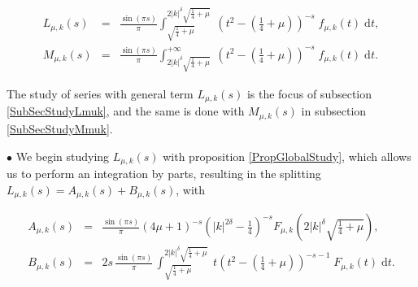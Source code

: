 \documentclass{jams-l}
\theoremstyle{definition}
\theoremstyle{remark}
\numberwithin{equation}{section}
\begin{document}
            \begin{equation}
            \label{LmukMmuk}
                \begin{array}{lll}
                    L_{\mu,k} \left( s \right) & = & \frac{\sin \left( \pi s \right)}{\pi} \int_{\sqrt{\frac{1}{4}+\mu}}^{2 \left \vert k \right \vert^{\delta} \sqrt{\frac{1}{4} + \mu}} \; \left( t^2 - \left( \frac{1}{4} + \mu \right) \right)^{-s} \; f_{\mu,k} \left( t \right) \; \text{d}t, \\[2em]
                    
                    M_{\mu,k} \left( s \right) & = & \frac{\sin \left( \pi s \right)}{\pi} \int_{2 \left \vert k \right \vert^{\delta} \sqrt{\frac{1}{4} + \mu}}^{+ \infty} \; \left( t^2 - \left( \frac{1}{4} + \mu \right) \right)^{-s} \; f_{\mu,k} \left( t \right) \; \text{d}t.
                \end{array}
            \end{equation}
            
            \noindent The study of series with general term $L_{\mu,k} \left( s \right)$ is the focus of subsection \ref{SubSecStudyLmuk}, and the same is done with $M_{\mu,k} \left( s \right)$ in subsection \ref{SubSecStudyMmuk}.
            
            \medskip
            
            \hspace{10pt} $\bullet$ We begin studying $L_{\mu,k} \left( s \right)$ with proposition \ref{PropGlobalStudy}, which allows us to perform an integration by parts, resulting in the splitting $L_{\mu,k} \left( s \right) = A_{\mu,k} \left( s \right) + B_{\mu,k} \left( s \right)$, with
            
                \begin{equation}
                \label{IntroAB}
                    \begin{array}{lll}
                        A_{\mu,k} \left( s \right) & = & \frac{\sin \left( \pi s \right)}{\pi} \left( 4 \mu + 1 \right)^{-s} \left( \left \vert k \right \vert^{2 \delta} - \frac{1}{4} \right)^{-s} F_{\mu,k} \left( 2 \left \vert k \right \vert^{\delta} \sqrt{\frac{1}{4}+\mu} \right), \\[2em]
                    
                        B_{\mu,k} \left( s \right) & = & 2s \, \frac{\sin \left( \pi s \right)}{\pi} \, \int_{\sqrt{\frac{1}{4}+\mu}}^{2 \left \vert k \right \vert^{\delta} \sqrt{\frac{1}{4}+\mu}} \; t \left( t^2 - \left( \frac{1}{4}+\mu \right) \right)^{-s-1} \; F_{\mu,k} \left( t \right) \; \text{d}t.
                    \end{array}
                \end{equation}
            
\end{document}
